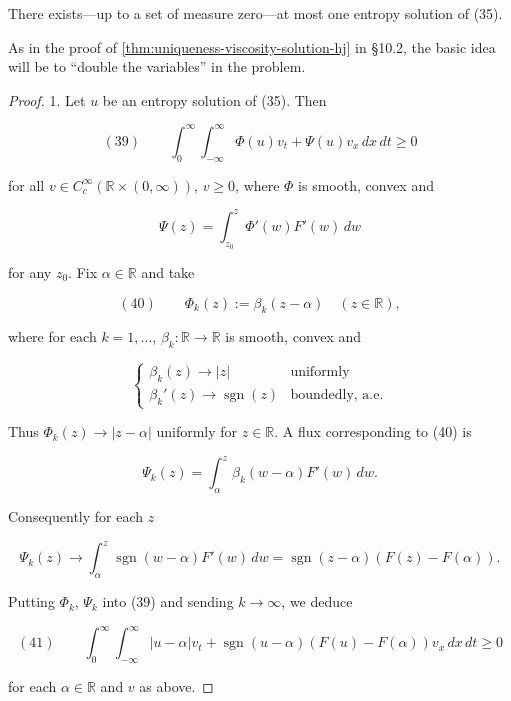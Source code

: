 \begin{theorem}
\label{thm:uniqueness-entropy-solutions-scalar-new}
There exists---up to a set of measure zero---at most one entropy solution of (35).
\end{theorem}

As in the proof of \cref{thm:uniqueness-viscosity-solution-hj} in \S10.2, the basic idea will be to ``double the variables'' in the problem.

\begin{proof}
1. Let $u$ be an entropy solution of (35). Then

$$(39) \qquad \int_0^\infty\int_{-\infty}^\infty \Phi(u)v_t + \Psi(u)v_x\,dx\,dt \geq 0$$

for all $v\in C_c^\infty(\mathbb{R}\times(0,\infty))$, $v\geq 0$, where $\Phi$ is smooth, convex and

$$\Psi(z) = \int_{z_0}^z \Phi'(w)F'(w)\,dw$$

for any $z_0$. Fix $\alpha\in\mathbb{R}$ and take

$$(40) \qquad \Phi_k(z) := \beta_k(z-\alpha) \quad (z\in\mathbb{R}),$$

where for each $k=1,\ldots$, $\beta_k:\mathbb{R}\to\mathbb{R}$ is smooth, convex and

$$\begin{cases} \beta_k(z) \to |z| & \text{uniformly} \\ \beta_k'(z) \to \operatorname{sgn}(z) & \text{boundedly, a.e.} \end{cases}$$

Thus $\Phi_k(z)\to|z-\alpha|$ uniformly for $z\in\mathbb{R}$. A flux corresponding to (40) is

$$\Psi_k(z) = \int_\alpha^z \beta_k(w-\alpha)F'(w)\,dw.$$

Consequently for each $z$

$$\Psi_k(z) \to \int_\alpha^z \operatorname{sgn}(w-\alpha)F'(w)\,dw = \operatorname{sgn}(z-\alpha)(F(z)-F(\alpha)).$$

Putting $\Phi_k$, $\Psi_k$ into (39) and sending $k\to\infty$, we deduce

$$(41) \qquad \int_0^\infty\int_{-\infty}^\infty |u-\alpha|v_t + \operatorname{sgn}(u-\alpha)(F(u)-F(\alpha))v_x\,dx\,dt \geq 0$$

for each $\alpha\in\mathbb{R}$ and $v$ as above.


\end{proof}
